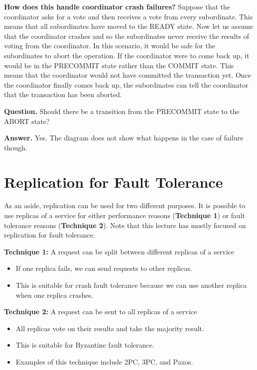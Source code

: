 \documentclass[twoside]{article}
\begin{document}
\textbf{How does this handle coordinator crash failures?} Suppose that the coordinator asks for a vote and then receives a vote from every subordinate. This means that all subordinates have moved to the {\ttfamily READY} state. Now let us assume that the coordinator crashes and so the subordinates never receive the results of voting from the coordinator. In this scenario, it would be safe for the subordinates to abort the operation. If the coordinator were to come back up, it would be in the {\ttfamily PRECOMMIT} state rather than the {\ttfamily COMMIT} state. This means that the coordinator would not have committed the transaction yet. Once the coordinator finally comes back up, the subordinates can tell the coordinator that the transaction has been aborted.

\textbf{Question.} Should there be a transition from the {\ttfamily PRECOMMIT} state to the {\ttfamily ABORT} state?

\textbf{Answer.} Yes. The diagram does not show what happens in the case of failure though.

\section{Replication for Fault Tolerance}

As an aside, replication can be used for two different purposes. It is possible to use replicas of a service for either performance reasons (\textbf{Technique 1}) or fault tolerance reasons (\textbf{Technique 2}). Note that this lecture has mostly focused on replication for fault tolerance.

\textbf{Technique 1:} A request can be split between different replicas of a service
\begin{itemize}
    \item If one replica fails, we can send requests to other replicas.
    \item This is suitable for crash fault tolerance because we can use another replica when one replica crashes.
\end{itemize}

\textbf{Technique 2:} A request can be sent to all replicas of a service
\begin{itemize}
    \item All replicas vote on their results and take the majority result.
    \item This is suitable for Byzantine fault tolerance.
    \item Examples of this technique include 2PC, 3PC, and Paxos.
\end{itemize}
\end{document}
